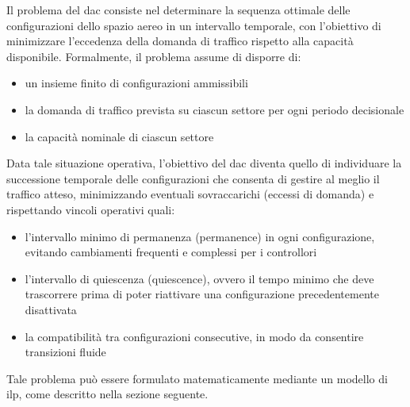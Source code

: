 Il problema del \acrfull{dac} consiste nel determinare la sequenza ottimale delle configurazioni dello spazio aereo in un intervallo temporale, con l'obiettivo di minimizzare l’eccedenza della domanda di traffico rispetto alla capacità disponibile. Formalmente, il problema assume di disporre di:
\begin{itemize}
    \item un insieme finito di configurazioni ammissibili
    \item la domanda di traffico prevista su ciascun settore per ogni periodo decisionale
    \item la capacità nominale di ciascun settore
\end{itemize}
Data tale situazione operativa, l'obiettivo del \acrshort{dac} diventa quello di individuare la successione temporale delle configurazioni che consenta di gestire al meglio il traffico atteso, minimizzando eventuali sovraccarichi (eccessi di domanda) e rispettando vincoli operativi quali:
\begin{itemize}
    \item l’intervallo minimo di permanenza (permanence) in ogni configurazione, evitando cambiamenti frequenti e complessi per i controllori
    \item l’intervallo di quiescenza (quiescence), ovvero il tempo minimo che deve trascorrere prima di poter riattivare una configurazione precedentemente disattivata
    \item la compatibilità tra configurazioni consecutive, in modo da consentire transizioni fluide
\end{itemize}


Tale problema può essere formulato matematicamente mediante un modello di \Gls{ilp}, come descritto nella sezione seguente.

